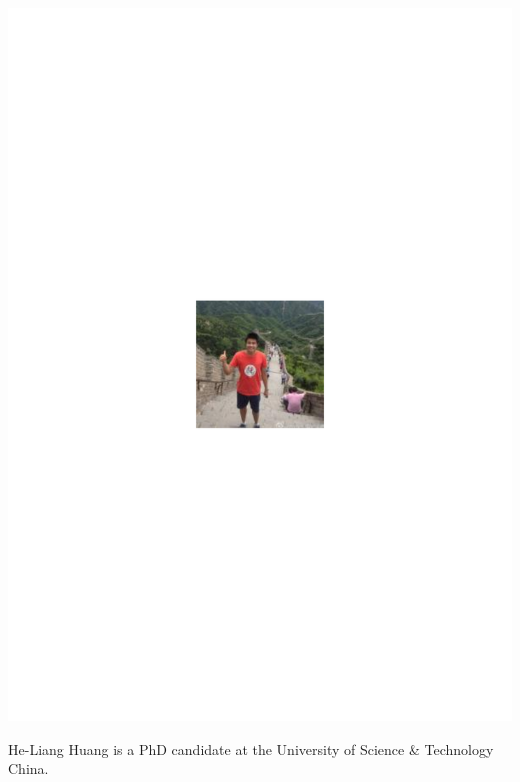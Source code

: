 \documentclass[aps,prl,twocolumn,amsmath,amssymb,nofootinbib,superscriptaddress]{revtex4}
\begin{document}
\includegraphics[width=\columnwidth]{photo_heliang_huang}

He-Liang Huang is a PhD candidate at the University of Science \& Technology China.
\end{document}
